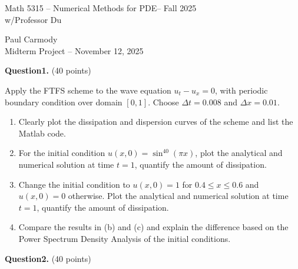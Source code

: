 \documentclass[12pt,a4paper]{report}
\newcommand{\CLASSNAME}{Math 5315 -- Numerical Methods for PDE}
\newcommand{\STUDENTNAME}{Paul Carmody}
\newcommand{\ASSIGNMENT}{Midterm Project }
\newcommand{\DUEDATE}{November 12, 2025}
\newcommand{\SEMESTER}{Fall 2025}
\begin{document}

\begin{center}
	\Large{\CLASSNAME -- \SEMESTER} \\
	\large{ w/Professor Du}
\end{center}
\begin{center}
	\STUDENTNAME \\
	\ASSIGNMENT -- \DUEDATE\\
\end{center} 
\HLINE

\textbf{Question1.} (40 points)

Apply the FTFS scheme to the wave equation $u_t-u_x=0$, with periodic boundary condition over domain $[0,1]$.  Choose $\Delta t = 0.008$ and $\Delta x=0.01$.
\begin{enumerate}[label=(\alph*)]

	\item Clearly plot the dissipation and dispersion curves of the scheme and list the Matlab code.
	
	\item For the initial condition $u(x,0) = \sin^{40}(\pi x)$, plot the analytical and numerical solution at time $t=1$, quantify the amount of dissipation.
	
	\item Change the initial condition to $u(x,0)=1$ for $0.4\le x \le 0.6$ and $u(x,0)=0$ otherwise.  Plot the analytical and numerical solution at time $t=1$, quantify the amount of dissipation.
	
	\item Compare the results in (b) and (c) and explain the difference based on the Power Spectrum Density Analysis of the initial conditions.

\end{enumerate}

\textbf{Question2.} (40 points)
\end{document}
